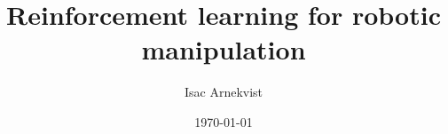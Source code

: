 \documentclass{kththesis}
\title{Reinforcement learning for robotic manipulation}
\author{Isac Arnekvist}
\date{\today}
\begin{document}
\frontmatter
\titlepage


\tableofcontents

\mainmatter

















{}

\end{document}
